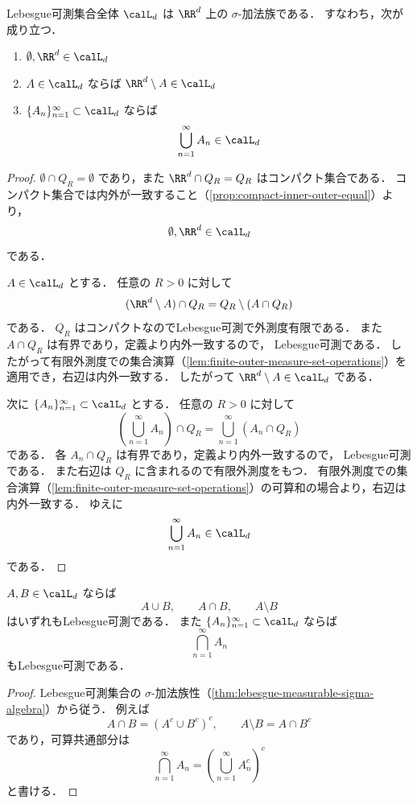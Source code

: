 \begin{theorem}\label{thm:lebesgue-measurable-sigma-algebra}
Lebesgue可測集合全体 $\calL_d$ は $\RR^d$ 上の $\sigma$-加法族である．
すなわち，次が成り立つ．
\begin{enumerate}
    \item $\emptyset,\RR^d\in\calL_d$
    \item $A\in\calL_d$ ならば $\RR^d\setminus A\in\calL_d$
    \item $\{A_n\}_{n=1}^{\infty}\subset\calL_d$ ならば
    \[
    \bigcup_{n=1}^{\infty}A_n\in\calL_d
    \]
\end{enumerate}
\end{theorem}
\begin{proof}
$\emptyset\cap Q_R=\emptyset$ であり，また
$\RR^d\cap Q_R=Q_R$ はコンパクト集合である．
コンパクト集合では内外が一致すること（\cref{prop:compact-inner-outer-equal}）より，
\[
\emptyset,\RR^d\in\calL_d
\]
である．

$A\in\calL_d$ とする．
任意の $R>0$ に対して
\[
(\RR^d\setminus A)\cap Q_R
=
Q_R\setminus(A\cap Q_R)
\]
である．
$Q_R$ はコンパクトなのでLebesgue可測で外測度有限である．
また $A\cap Q_R$ は有界であり，定義より内外一致するので，
Lebesgue可測である．
したがって有限外測度での集合演算（\cref{lem:finite-outer-measure-set-operations}）を適用でき，右辺は内外一致する．
したがって $\RR^d\setminus A\in\calL_d$ である．

次に $\{A_n\}_{n=1}^{\infty}\subset\calL_d$ とする．
任意の $R>0$ に対して
\[
\left(\bigcup_{n=1}^{\infty}A_n\right)\cap Q_R
=
\bigcup_{n=1}^{\infty}(A_n\cap Q_R)
\]
である．
各 $A_n\cap Q_R$ は有界であり，定義より内外一致するので，
Lebesgue可測である．
また右辺は $Q_R$ に含まれるので有限外測度をもつ．
有限外測度での集合演算（\cref{lem:finite-outer-measure-set-operations}）の可算和の場合より，右辺は内外一致する．
ゆえに
\[
\bigcup_{n=1}^{\infty}A_n\in\calL_d
\]
である．
\end{proof}

\begin{corollary}[集合演算]\label{cor:lebesgue-measurable-set-operations}
$A,B\in\calL_d$ ならば
\[
A\cup B,\qquad A\cap B,\qquad A\setminus B
\]
はいずれもLebesgue可測である．
また $\{A_n\}_{n=1}^{\infty}\subset\calL_d$ ならば
\[
\bigcap_{n=1}^{\infty}A_n
\]
もLebesgue可測である．
\end{corollary}
\begin{proof}
Lebesgue可測集合の $\sigma$-加法族性（\cref{thm:lebesgue-measurable-sigma-algebra}）から従う．
例えば
\[
A\cap B=(A^c\cup B^c)^c,
\qquad
A\setminus B=A\cap B^c
\]
であり，可算共通部分は
\[
\bigcap_{n=1}^{\infty}A_n
=
\left(\bigcup_{n=1}^{\infty}A_n^c\right)^c
\]
と書ける．
\end{proof}

